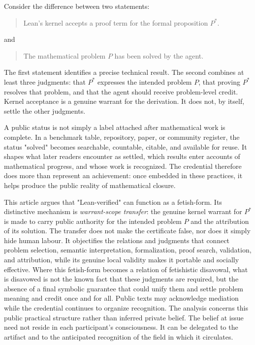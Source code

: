 \documentclass[pdflatex,sn-apa]{sn-jnl}
\begin{document}
Consider the difference between two statements:

\begin{quote}
Lean's kernel accepts a proof term for the formal proposition \(P^*\).
\end{quote}

and

\begin{quote}
The mathematical problem \(P\) has been solved by the agent.
\end{quote}

The first statement identifies a precise technical result. The second combines at least three judgments: that \(P^*\) expresses the intended problem \(P\), that proving \(P^*\) resolves that problem, and that the agent should receive problem-level credit. Kernel acceptance is a genuine warrant for the derivation. It does not, by itself, settle the other judgments.

A public status is not simply a label attached after mathematical work is complete. In a benchmark table, repository, paper, or community register, the status "solved" becomes searchable, countable, citable, and available for reuse. It shapes what later readers encounter as settled, which results enter accounts of mathematical progress, and whose work is recognized. The credential therefore does more than represent an achievement: once embedded in these practices, it helps produce the public reality of mathematical closure.

This article argues that "Lean-verified" can function as a fetish-form. Its distinctive mechanism is \emph{warrant-scope transfer}: the genuine kernel warrant for \(P^*\) is made to carry public authority for the intended problem \(P\) and the attribution of its solution. The transfer does not make the certificate false, nor does it simply hide human labour. It objectifies the relations and judgments that connect problem selection, semantic interpretation, formalization, proof search, validation, and attribution, while its genuine local validity makes it portable and socially effective. Where this fetish-form becomes a relation of fetishistic disavowal, what is disavowed is not the known fact that these judgments are required, but the absence of a final symbolic guarantee that could unify them and settle problem meaning and credit once and for all. Public texts may acknowledge mediation while the credential continues to organize recognition. The analysis concerns this public practical structure rather than inferred private belief.
The belief at issue need not reside in each participant's consciousness. It can be delegated to the artifact and to the anticipated recognition of the field in which it circulates.
\end{document}
